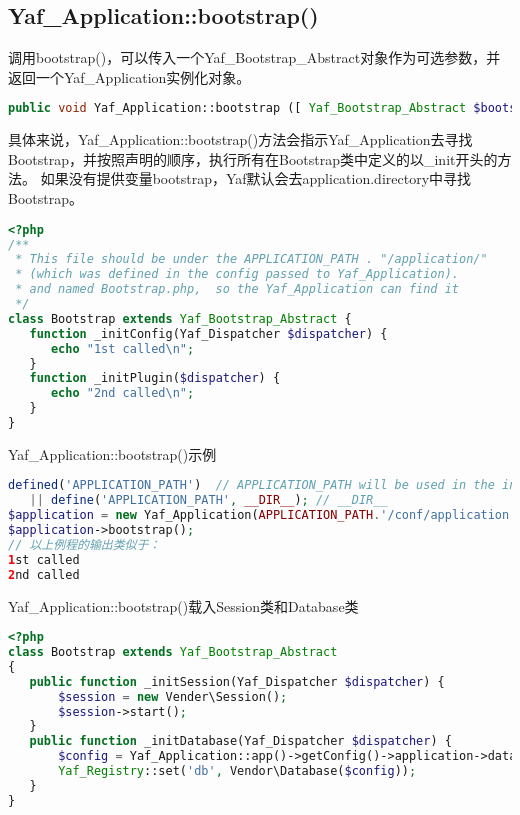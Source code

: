 \subsection{Yaf\_Application::bootstrap()}

调用bootstrap()，可以传入一个Yaf\_Bootstrap\_Abstract对象作为可选参数，并返回一个Yaf\_Application实例化对象。

\begin{lstlisting}[language=PHP]
public void Yaf_Application::bootstrap ([ Yaf_Bootstrap_Abstract $bootstrap ] )
\end{lstlisting}

具体来说，Yaf\_Application::bootstrap()方法会指示Yaf\_Application去寻找Bootstrap，并按照声明的顺序，执行所有在Bootstrap类中定义的以\_init开头的方法。 如果没有提供变量bootstrap，Yaf默认会去application.directory中寻找Bootstrap。

\begin{lstlisting}[language=PHP]
<?php
/**
 * This file should be under the APPLICATION_PATH . "/application/"
 * (which was defined in the config passed to Yaf_Application).
 * and named Bootstrap.php,  so the Yaf_Application can find it 
 */
class Bootstrap extends Yaf_Bootstrap_Abstract {
   function _initConfig(Yaf_Dispatcher $dispatcher) {
      echo "1st called\n";
   }
   function _initPlugin($dispatcher) {
      echo "2nd called\n";
   }
}
\end{lstlisting}

\begin{example}
Yaf\_Application::bootstrap()示例
\begin{lstlisting}[language=PHP]
defined('APPLICATION_PATH')  // APPLICATION_PATH will be used in the ini config file
   || define('APPLICATION_PATH', __DIR__); // __DIR__
$application = new Yaf_Application(APPLICATION_PATH.'/conf/application.ini');
$application->bootstrap();
// 以上例程的输出类似于：
1st called
2nd called
\end{lstlisting}
\end{example}


\begin{example}
Yaf\_Application::bootstrap()载入Session类和Database类
\begin{lstlisting}[language=PHP]
<?php
class Bootstrap extends Yaf_Bootstrap_Abstract 
{
   public function _initSession(Yaf_Dispatcher $dispatcher) {
       $session = new Vender\Session();
       $session->start();
   }
   public function _initDatabase(Yaf_Dispatcher $dispatcher) {
       $config = Yaf_Application::app()->getConfig()->application->database;
       Yaf_Registry::set('db', Vendor\Database($config));
   }
}
\end{lstlisting}
\end{example}

